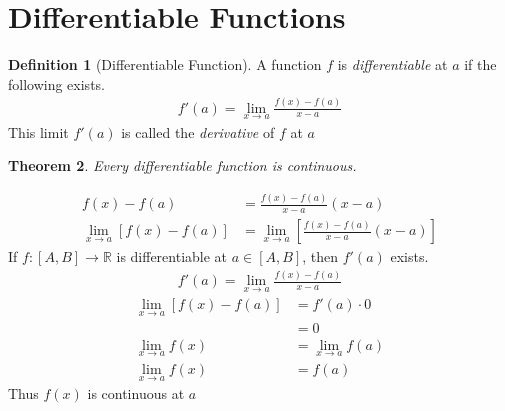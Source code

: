 \documentclass{amsart}
\numberwithin{equation}{section}
\let\oldendproof\endproof
\renewenvironment{proof}[1][\proofname]{%
  \setcounter{case}{0}
  \setcounter{step}{0}
  \oldproof[#1]%
}{\oldendproof}
\theoremstyle{plain}
\newtheorem{theorem}{Theorem}[section]
\theoremstyle{definition}
\newtheorem{definition}[theorem]{Definition}
\theoremstyle{remark}
\begin{document}
\section{Differentiable Functions}

\begin{definition}[Differentiable Function]
  A function $f$ is \emph{differentiable} at $a$ if the following exists.
  \begin{align}
    f'(a) = \lim_{x\to a} \frac{f(x) - f(a)}{x-a}
  \end{align}
  This limit $f'(a)$ is called the \emph{derivative} of $f$ at $a$
\end{definition}

\begin{theorem}
  Every differentiable function is continuous.
\end{theorem}
\begin{proof}
  \begin{align}
    f(x) - f(a) &= \frac{f(x)-f(a)}{x-a} (x-a)\\
    \lim_{x\to a} \left[f(x) - f(a)\right] &= \lim_{x\to a} \left[\frac{f(x) -f(a)}{x-a} (x-a)\right]
  \end{align}
  If $f:[A,B] \to \mathbb{R}$ is differentiable at $a\in [A,B]$, then $f'(a)$ exists.
  \begin{align}
    f'(a) = \lim_{x\to a} \frac{f(x)-f(a)}{x-a}
  \end{align}
  \begin{align}
    \lim_{x\to a} \left[f(x)- f(a)\right] &= f'(a) \cdot 0\\
    &= 0\nonumber\\
    \lim_{x\to a} f(x) &= \lim_{x\to a} f(a)\nonumber\\
    \lim_{x\to a} f(x) &= f(a)
  \end{align}
  Thus $f(x)$ is continuous at $a$
\end{proof}
\end{document}
